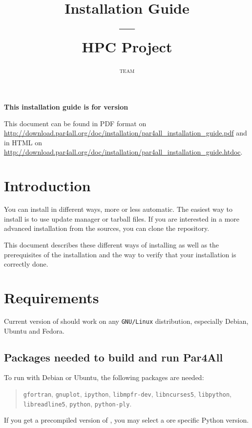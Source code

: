 \documentclass[a4paper]{article}
\newcommand{\LINK}[1]{\url{#1}\xspace}
\newcommand{\PfaInstallationPDF}{\LINK{http://download.par4all.org/doc/installation/par4all_installation_guide.pdf}}
\newcommand{\PfaAllInstallationHTDOC}{\LINK{http://download.par4all.org/doc/installation/par4all_installation_guide.htdoc}}
\begin{document}
\title{\protect\Apfa Installation Guide\\
  ---\\
  HPC Project}

\author{\Apfa \textsc{team}}

\maketitle

\noindent\textbf{This installation guide is for \Apfa version }
\bigskip

This document can be found in PDF format on \PfaInstallationPDF and in HTML
on \PfaAllInstallationHTDOC.


\section{Introduction}
\label{sec:introduction}


You can install \Apfa in different ways, more or less automatic. The easiest
way to install \Apfa is to use update manager or tarball files. If you are
interested in a more advanced installation from the sources, you can clone
the \Apfa{} \Agit repository.

This document describes these different ways of installing \Apfa as well
as the prerequisites of the installation and the way to verify that your
installation is correctly done.


\section{Requirements}
\label{sec:requirements}

Current version of \Apfa should work on any \texttt{GNU/Linux}
distribution, especially Debian, Ubuntu and Fedora.


\subsection{Packages needed to build and run Par4All}
\label{sec:pack-need-build}


To run \Apfa with Debian or Ubuntu, the following packages are needed:
\begin{quote}
  \texttt{gfortran}, \texttt{gnuplot}, \texttt{ipython},
  \texttt{libmpfr-dev}, \texttt{libncurses5}, \texttt{libpython},
  \texttt{libreadline5}, \texttt{python}, \texttt{python-ply}.
\end{quote}
If you get a precompiled version of \Apfa, you may select a ore specific
Python version.
\end{document}
